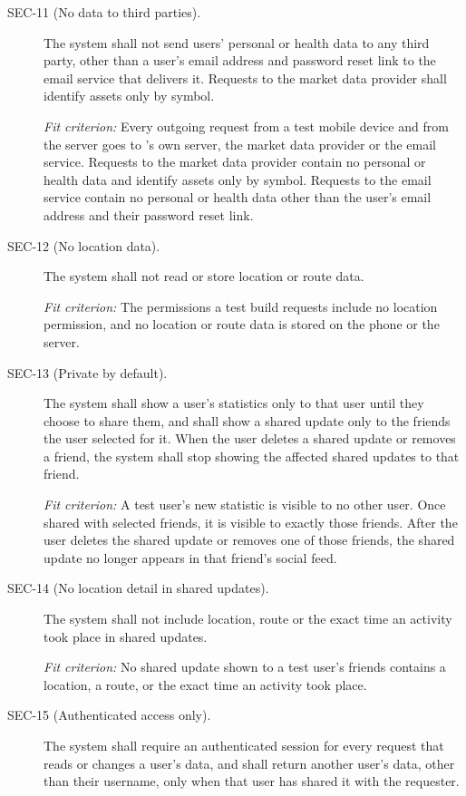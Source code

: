 \documentclass[12pt]{article}
\begin{document}
\begin{description}
\item[SEC-11 (No data to third parties).] The system shall not send users' personal or health data to any third party,
other than a user's email address and password reset link to the email service
that delivers it. Requests to the market data provider shall identify assets
only by symbol.

\textit{Fit criterion:} Every outgoing request from a test mobile device and
from the server goes to \progname{}'s own server, the market data provider or
the email service. Requests to the market data provider contain no personal or
health data and identify assets only by symbol. Requests to the email service
contain no personal or health data other than the user's email address and
their password reset link.

\item[SEC-12 (No location data).] The system shall not read or store location or route data.

\textit{Fit criterion:} The permissions a test build requests include no
location permission, and no location or route data is stored on the phone or
the server.

\item[SEC-13 (Private by default).] The system shall show a user's statistics only to that user until they choose
to share them, and shall show a shared update only to the friends the user
selected for it. When the user deletes a shared update or removes a friend,
the system shall stop showing the affected shared updates to that friend.

\textit{Fit criterion:} A test user's new statistic is visible to no other
user. Once shared with selected friends, it is visible to exactly those
friends. After the user deletes the shared update or removes one of those
friends, the shared update no longer appears in that friend's social feed.

\item[SEC-14 (No location detail in shared updates).] The system shall not include location, route or the exact time an activity
took place in shared updates.

\textit{Fit criterion:} No shared update shown to a test user's friends
contains a location, a route, or the exact time an activity took place.

\item[SEC-15 (Authenticated access only).] The system shall require an authenticated session for every request that reads
or changes a user's data, and shall return another user's data, other than
their username, only when that user has shared it with the requester.


\end{description}
\end{document}
